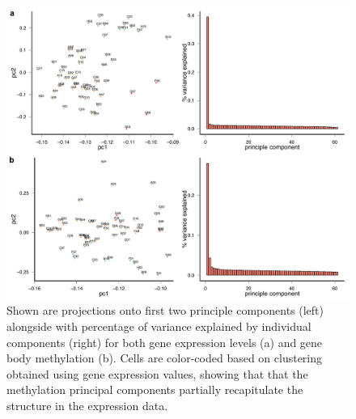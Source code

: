 \begin{figure}[htbp!]
\centering
\includegraphics[width=1.0\textwidth]{cca}
\caption[Principal-component analysis of gene-body methylation and gene expression in serum-grown ESCs.]{Shown are projections onto first two principle components (left) alongside with percentage of variance explained by individual components (right) for both gene expression levels (a) and gene body methylation (b). Cells are color-coded based on clustering obtained using gene expression values, showing that that the methylation principal components partially recapitulate the structure in the expression data.}
\label{fig:mt_cca}
\end{figure}

